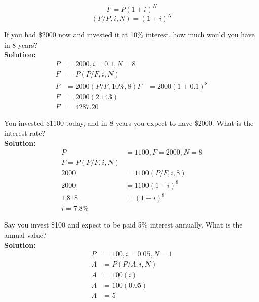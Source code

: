 \begin{corallary}
    \[
        F = P(1+i)^N
    \]
    \[
        (F/P, i, N) = (1+i)^N
    \]
\end{corallary}

\begin{example}
    If you had \$2000 now and invested it at 10\% interest, how much would you have in 8 years? \\
    \textbf{Solution:}
    \begin{align}
        P & = 2000, i = 0.1, N = 8 \\
        F & = P(P/F, i, N)         \\
        F & = 2000(P/F, 10\%, 8)
        F & = 2000(1+0.1)^8        \\
        F & = 2000(2.143)          \\
        F & = 4287.20
    \end{align}
\end{example}

\begin{example}
    You invested \$1100 today, and in 8 years you expect to have \$2000. What is the interest rate? \\
    \textbf{Solution:}
    \begin{align}
        P     & = 1100, F = 2000, N = 8 \\
        F = P(P/F, i, N)                \\
        2000  & = 1100(P/F, i, 8)       \\
        2000  & = 1100(1+i)^8           \\
        1.818 & = (1+i)^8               \\
        i = 7.8\%
    \end{align}
\end{example}

\begin{example}
    Say you invest \$100 and expect to be paid 5\% interest annually. What is the annual value? \\
    \textbf{Solution:}
    \begin{align}
        P & = 100, i = 0.05, N = 1 \\
        A & = P(P/A, i, N)         \\
        A & = 100(i)               \\
        A & = 100(0.05)            \\
        A & = 5
    \end{align}
\end{example}

